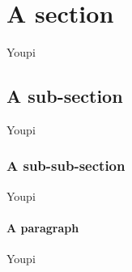 \section{A section}
%
Youpi

\subsection{A sub-section}
%
Youpi

\subsubsection{A sub-sub-section}
%
Youpi

\paragraph{A paragraph}
%
Youpi